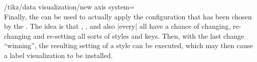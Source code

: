 \begin{key}{/tikz/data visualization/new axis system=\\ %
}
    Finally, the  can be used to actually apply the configuration that has been chosen by the . The idea is that , , and also |every|  all have a chance of changing, re-changing and re-setting all sorts of styles and keys. Then, with the last change ``winning'', the resulting setting of a style can be executed, which may then cause a label visualization to be installed.
\end{key}
